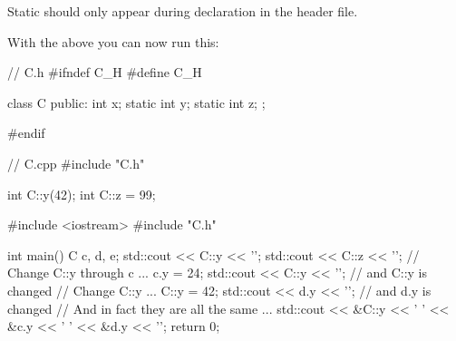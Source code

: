 Static should only appear during declaration in the header file.

With the above you can now run this:

\begin{consolethree}[escapeinside=||]
// C.h
#ifndef C_H
#define C_H

class C
{
public:
    int x;
    static int y;
    static int z;
};

#endif
\end{consolethree}

\begin{consolethree}[escapeinside=||]
// C.cpp
#include "C.h"

int C::y(42);
int C::z = 99;
\end{consolethree}

\begin{consolethree}[escapeinside=||]
#include <iostream>
#include "C.h"

int main()
{
    C c, d, e;
    std::cout << C::y << '\n';
    std::cout << C::z << '\n';
    // Change C::y through c ...
    c.y = 24;
    std::cout << C::y << '\n'; // and C::y is changed
    // Change C::y ...
    C::y = 42;
    std::cout << d.y << '\n'; // and d.y is changed
    // And in fact they are all the same ...
    std::cout << &C::y << ' '
              << &c.y << ' '
              << &d.y << '\n';
    return 0;
}
\end{consolethree}


